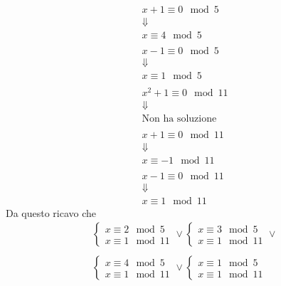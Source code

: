 \begin{example}
\begin{equation*}
\begin{array}{c}
			\\
			x + 1 \equiv 0 \mod{5}                     \\
			\Downarrow                                 \\
			x \equiv 4 \mod{5}                         \\
			\\
			x - 1 \equiv 0 \mod{5}                     \\
			\Downarrow                                 \\
			x \equiv 1 \mod{5}                         \\
			\\
			x^2 + 1 \equiv 0 \mod{11}                  \\
			\Downarrow                                 \\
			\text{Non ha soluzione}                    \\
			\\
			x + 1 \equiv 0 \mod{11}                    \\
			\Downarrow                                 \\
			x \equiv -1 \mod{11}                       \\
			\\
			x - 1 \equiv 0 \mod{11}                    \\
			\Downarrow                                 \\
			x \equiv 1 \mod{11}
		\end{array}
	\end{equation*}
	Da questo ricavo che
	\begin{equation*}
		\begin{array}{c}
			\begin{cases}
				x \equiv 2 \mod{5} \\
				x \equiv 1 \mod{11}
			\end{cases} \vee
			\begin{cases}
				x \equiv 3 \mod{5} \\
				x \equiv 1 \mod{11}
			\end{cases} \vee  \\
			\\
			\begin{cases}
				x \equiv 4 \mod{5} \\
				x \equiv 1 \mod{11}
			\end{cases} \vee
			\begin{cases}
				x \equiv 1 \mod{5} \\
				x \equiv 1 \mod{11}

\end{cases}
\end{array}
\end{equation*}
\end{example}
